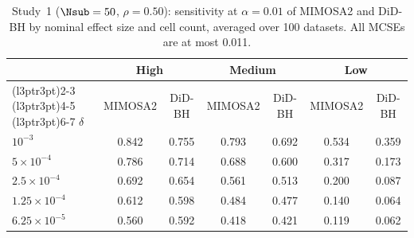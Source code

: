 \begin{table}[!h]
\centering
\caption{\label{tab:base-sens}Study~1 ($\Nsub = 50$, $\rho = 0.50$): sensitivity at $\alpha = 0.01$ of MIMOSA2 and DiD-BH by nominal effect size and cell count, averaged over 100 datasets. All MCSEs are at most 0.011.}
\centering
\begin{tabular}[t]{lcccccc}
\toprule
\multicolumn{1}{c}{ } & \multicolumn{2}{c}{High} & \multicolumn{2}{c}{Medium} & \multicolumn{2}{c}{Low} \\
\cmidrule(l{3pt}r{3pt}){2-3} \cmidrule(l{3pt}r{3pt}){4-5} \cmidrule(l{3pt}r{3pt}){6-7}
$\delta$ & MIMOSA2 & DiD-BH & MIMOSA2 & DiD-BH & MIMOSA2 & DiD-BH\\
\midrule
$10^{-3}$ & 0.842 & 0.755 & 0.793 & 0.692 & 0.534 & 0.359\\
$5\times10^{-4}$ & 0.786 & 0.714 & 0.688 & 0.600 & 0.317 & 0.173\\
$2.5\times10^{-4}$ & 0.692 & 0.654 & 0.561 & 0.513 & 0.200 & 0.087\\
$1.25\times10^{-4}$ & 0.612 & 0.598 & 0.484 & 0.477 & 0.140 & 0.064\\
$6.25\times10^{-5}$ & 0.560 & 0.592 & 0.418 & 0.421 & 0.119 & 0.062\\
\bottomrule
\end{tabular}
\end{table}
